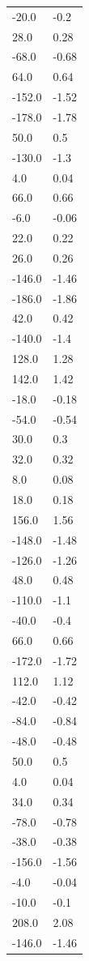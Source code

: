 \begin{longtable}{ll}
-20.0 & -0.2 \\
28.0 & 0.28 \\
-68.0 & -0.68 \\
64.0 & 0.64 \\
-152.0 & -1.52 \\
-178.0 & -1.78 \\
50.0 & 0.5 \\
-130.0 & -1.3 \\
4.0 & 0.04 \\
66.0 & 0.66 \\
-6.0 & -0.06 \\
22.0 & 0.22 \\
26.0 & 0.26 \\
-146.0 & -1.46 \\
-186.0 & -1.86 \\
42.0 & 0.42 \\
-140.0 & -1.4 \\
128.0 & 1.28 \\
142.0 & 1.42 \\
-18.0 & -0.18 \\
-54.0 & -0.54 \\
30.0 & 0.3 \\
32.0 & 0.32 \\
8.0 & 0.08 \\
18.0 & 0.18 \\
156.0 & 1.56 \\
-148.0 & -1.48 \\
-126.0 & -1.26 \\
48.0 & 0.48 \\
-110.0 & -1.1 \\
-40.0 & -0.4 \\
66.0 & 0.66 \\
-172.0 & -1.72 \\
112.0 & 1.12 \\
-42.0 & -0.42 \\
-84.0 & -0.84 \\
-48.0 & -0.48 \\
50.0 & 0.5 \\
4.0 & 0.04 \\
34.0 & 0.34 \\
-78.0 & -0.78 \\
-38.0 & -0.38 \\
-156.0 & -1.56 \\
-4.0 & -0.04 \\
-10.0 & -0.1 \\
208.0 & 2.08 \\
-146.0 & -1.46 \\

\end{longtable}

